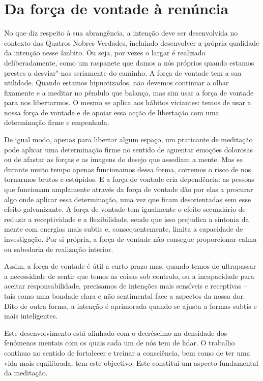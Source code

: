 \section{Da força de vontade à renúncia}

No que diz respeito à sua abrangência, a intenção deve ser desenvolvida no
contexto das Quatros Nobres Verdades, incluindo desenvolver a própria qualidade
da intenção nesse âmbito. Ou seja, por vezes o largar é realizado
deliberadamente, como um raspanete que damos a nós próprios quando estamos
prestes a desviar"-nos seriamente do caminho. A força de vontade tem a sua
utilidade. Quando estamos hipnotizados, não devemos continuar a olhar fixamente
e a meditar no pêndulo que balança, mas sim usar a força de vontade para nos
libertarmos. O mesmo se aplica aos hábitos viciantes: temos de usar a nossa
força de vontade e de apoiar essa acção de libertação com uma determinação firme
e empenhada.

De igual modo, apenas para libertar algum espaço, um praticante de meditação
pode aplicar uma determinação firme no sentido de aguentar emoções dolorosas ou
de afastar as forças e as imagens do desejo que assediam a mente. Mas se durante
muito tempo apenas funcionamos dessa forma, corremos o risco de nos tornarmos
brutos e estúpidos. E a força de vontade cria dependência: as pessoas que
funcionam amplamente através da força de vontade dão por elas a procurar algo
onde aplicar essa determinação, uma vez que ficam desorientadas sem esse efeito
galvanizante. A força de vontade tem igualmente o efeito secundário de reduzir a
receptividade e a flexibilidade, sendo que isso prejudica a sintonia da mente
com energias mais subtis e, consequentemente, limita a capacidade de
investigação. Por si própria, a força de vontade não consegue proporcionar calma
ou sabedoria de realização interior.

Assim, a força de vontade é útil a curto prazo mas, quando temos de ultrapassar
a necessidade de sentir que temos as coisas sob controlo, ou a incapacidade para
aceitar responsabilidade, precisamos de intenções mais sensíveis e receptivas --
tais como uma bondade clara e não sentimental face a aspectos da nossa dor. Dito
de outra forma, a intenção é aprimorada quando se ajusta a formas subtis e mais
inteligentes.

Este desenvolvimento está alinhado com o decréscimo na densidade dos fenómenos
mentais com os quais cada um de nós tem de lidar. O trabalho contínuo no sentido
de fortalecer e treinar a consciência, bem como de ter uma vida mais
equilibrada, tem este objectivo. Este constitui um aspecto fundamental da
meditação.

